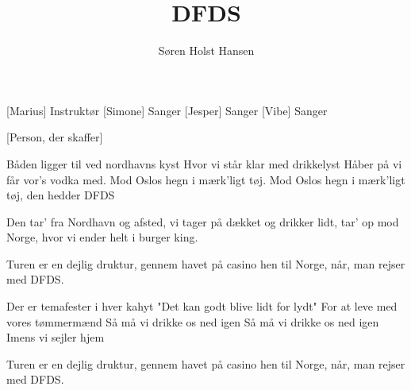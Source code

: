 \documentclass[a4paper,11pt]{article}
\title{DFDS}
\author{Søren Holst Hansen}
\begin{document}
\maketitle

\begin{roles}
[Marius] Instruktør
[Simone] Sanger
[Jesper] Sanger
[Vibe] Sanger
\end{roles}

\begin{props}
[Person, der skaffer]
\end{props}


\begin{song}
Båden ligger til ved nordhavns kyst
Hvor vi står klar med drikkelyst
Håber på vi får vor’s vodka med.
Mod Oslos hegn i mærk’ligt tøj.
Mod Oslos hegn i mærk’ligt tøj,
den hedder DFDS

Den tar’ fra Nordhavn og afsted,
vi tager på dækket og drikker lidt,
tar’ op mod Norge,
hvor vi ender helt i burger king.

Turen er en dejlig druktur, gennem havet på casino hen til Norge, når, man rejser med DFDS.

Der er temafester i hver kahyt
"Det kan godt blive lidt for lydt"
For at leve med vores tømmermænd
Så må vi drikke os ned igen
Så må vi drikke os ned igen
Imens vi sejler hjem

Turen er en dejlig druktur, gennem havet på casino hen til Norge, når, man rejser med DFDS.
\end{song}
\end{document}
